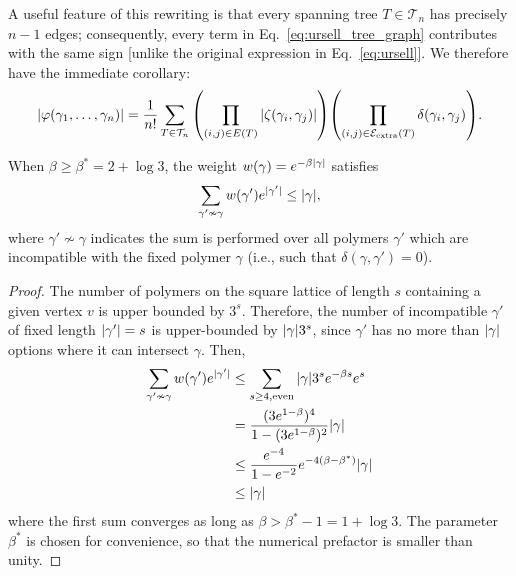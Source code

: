 A useful feature of this rewriting is that every spanning tree $T \in \mathcal{T}_n$ has precisely $n-1$ edges; consequently, every term in Eq.~\eqref{eq:ursell_tree_graph} contributes with the same sign [unlike the original expression in Eq.~\eqref{eq:ursell}]. We therefore have the immediate corollary:
\begin{equation}
\label{eq:ursell_tree_graph_abs}
    \abs{\varphi(\gamma_1, \ldots , \gamma_n)} = \frac{1}{n!} \sum_{T \in \mathcal{T}_n} \qty( \prod_{(i, j) \in E(T)} \abs{\zeta(\gamma_i, \gamma_j)} ) \qty( \prod_{(i, j) \in \mathcal{E}_{\text{extra}}(T)} \delta(\gamma_i, \gamma_j) ) .
\end{equation}







\begin{lemma}
\label{lemma:KP} 
When $\beta \geq \beta^\ast = 2 +\log 3$, the weight $w(\gamma) = e^{-\beta \abs{\gamma}}$ satisfies
\begin{equation}
    \sum_{\gamma' \nsim \gamma} w(\gamma') e^{|\gamma'|} \leq \abs{\gamma},
\end{equation}
where $\gamma' \nsim \gamma$ indicates the sum is performed over all polymers $\gamma'$ which are incompatible with the fixed polymer $\gamma$ (i.e., such that $\delta(\gamma, \gamma') = 0$).
\end{lemma}

\begin{proof}
The number of polymers on the square lattice of length $s$ containing a given vertex $v$ is upper bounded by $3^s$. 
Therefore, the number of incompatible $\gamma'$ of fixed length $\abs{\gamma'} = s$ is upper-bounded by $\abs{\gamma} 3^{s}$, since $\gamma'$ has no more than $\abs{\gamma}$ options where it can intersect $\gamma$. Then,
\begin{subequations}
    \begin{align}
    \sum_{\gamma' \nsim \gamma} w(\gamma') e^{|\gamma'|} &\leq \sum_{s\geq 4, \mathrm{even}} \abs{\gamma} 3^s e^{-\beta s} e^{s}  \\
    &= \frac{(3e^{1-\beta})^4}{1 - (3e^{1-\beta})^2} \abs{\gamma} \\
    &\leq \frac{e^{-4}}{1 - e^{-2}} e^{-4(\beta - \beta^\ast)} \abs{\gamma} \\
    &\leq \abs{\gamma}
\end{align}
\end{subequations}
where the first sum converges as long as $ \beta > \beta^\ast -1 = 1 + \log 3$. The parameter $\beta^*$ is chosen for convenience, so that the numerical prefactor is smaller than unity.
\end{proof}




